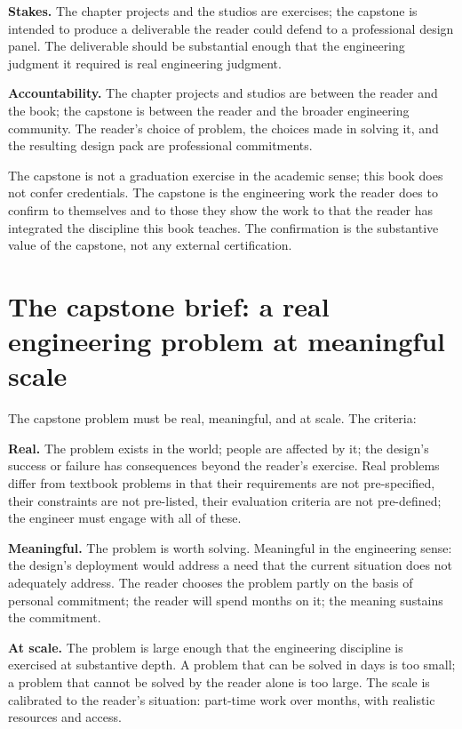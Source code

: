 \textbf{Stakes.} The chapter projects and the studios are exercises; the capstone is intended to produce a deliverable the reader could defend to a professional design panel. The deliverable should be substantial enough that the engineering judgment it required is real engineering judgment.

\textbf{Accountability.} The chapter projects and studios are between the reader and the book; the capstone is between the reader and the broader engineering community. The reader's choice of problem, the choices made in solving it, and the resulting design pack are professional commitments.

The capstone is not a graduation exercise in the academic sense; this book does not confer credentials. The capstone is the engineering work the reader does to confirm to themselves and to those they show the work to that the reader has integrated the discipline this book teaches. The confirmation is the substantive value of the capstone, not any external certification.

\section{The capstone brief: a real engineering problem at meaningful scale}

The capstone problem must be real, meaningful, and at scale. The criteria:

\textbf{Real.} The problem exists in the world; people are affected by it; the design's success or failure has consequences beyond the reader's exercise. Real problems differ from textbook problems in that their requirements are not pre-specified, their constraints are not pre-listed, their evaluation criteria are not pre-defined; the engineer must engage with all of these.

\textbf{Meaningful.} The problem is worth solving. Meaningful in the engineering sense: the design's deployment would address a need that the current situation does not adequately address. The reader chooses the problem partly on the basis of personal commitment; the reader will spend months on it; the meaning sustains the commitment.

\textbf{At scale.} The problem is large enough that the engineering discipline is exercised at substantive depth. A problem that can be solved in days is too small; a problem that cannot be solved by the reader alone is too large. The scale is calibrated to the reader's situation: part-time work over months, with realistic resources and access.

